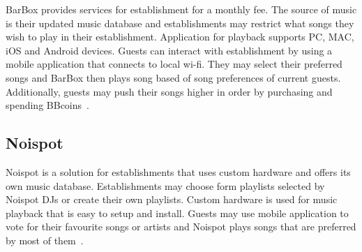 BarBox provides services for establishment for a monthly fee. The source of music is their updated music database and establishments may restrict what songs they wish to play in their establishment. Application for playback supports PC, MAC, iOS and Android devices. Guests can interact with establishment by using a mobile application that connects to local wi-fi. They may select their preferred songs and BarBox then plays song based of song preferences of current guests. Additionally, guests may push their songs higher in order by purchasing and spending BBcoins~\citep{barbox}.

\subsection{Noispot}

Noispot is a solution for establishments that uses custom hardware and offers its own music database. Establishments may choose form playlists selected by Noispot DJs or create their own playlists. Custom hardware is used for music playback that is easy to setup and install. Guests may use mobile application to vote for their favourite songs or artists and Noispot plays songs that are preferred by most of them~\citep{noispot}.